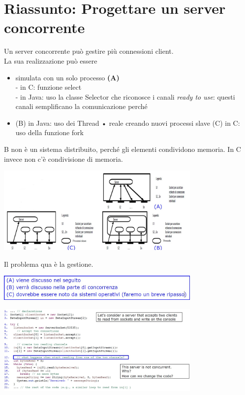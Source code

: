 \section{Riassunto: Progettare un server concorrente}
Un server concorrente può gestire più connessioni client.
\\La sua realizzazione può essere
\begin{itemize}
    \item simulata con un solo processo \textbf{(A)} 
    \\- in C: funzione select
    \\- in Java: uso la classe Selector che riconosce i canali \textit{ready to use}: questi canali semplificano la comunicazione perché  
    \item (B) in Java: uso dei Thread
• reale creando nuovi processi slave
(C) in C: uso della funzione fork
\end{itemize}
B non è un sistema distribuito, perché gli elementi condividono memoria. In C invece non c'è condivisione di memoria.
\begin{center}
    \includegraphics[width=0.75\textwidth]{img/serverConcorrenti1.jpg}
\end{center}
Il problema qua è la gestione.

\begin{center}
    \includegraphics[width=0.75\textwidth]{img/dacanc1.jpg}
\end{center}

\begin{center}
    \includegraphics[width=0.75\textwidth]{img/serverConcorrenti2.jpg}
\end{center}

